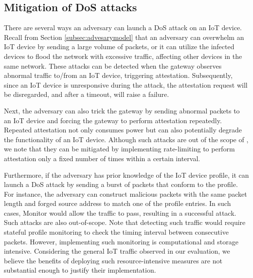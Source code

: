 \subsection{Mitigation of DoS attacks}
There are several ways an adversary can launch a DoS attack on an IoT device.
Recall from Section \ref{subsec:advesarymodel} that an adversary can overwhelm an IoT device by sending a large volume of packets, or it can utilize the infected devices to flood the network with excessive traffic, affecting other devices in the same network.
These attacks can be detected when the gateway observes abnormal traffic to/from an IoT device, triggering attestation.
Subsequently, since an IoT device is unresponsive during the attack, the attestation request will be disregarded, and after a timeout, \system will raise a failure.

Next, the adversary can also trick the gateway by sending abnormal packets to an IoT device and forcing the gateway to perform attestation repeatedly. 
Repeated attestation not only consumes power but can also potentially degrade the functionality of an IoT device.
Although such attacks are out of the scope of \system,  we note that they can be mitigated by implementing rate-limiting to perform attestation only a fixed number of times within a certain interval.

Furthermore, if the adversary has prior knowledge of the IoT device profile, it can launch a DoS attack by sending a burst of packets that conform to the profile.
For instance, the adversary can construct malicious packets with the same packet length and forged source address to match one of the profile entries.
In such cases, Monitor would allow the traffic to pass, resulting in a successful attack.  
Such attacks are also out-of-scope.
Note that detecting such traffic would require stateful profile monitoring to check the timing interval between consecutive packets. 
However, implementing such monitoring is computational and storage intensive.
Considering the general IoT traffic observed in our evaluation, we believe the benefits of deploying such resource-intensive measures are not substantial enough to justify their implementation.


